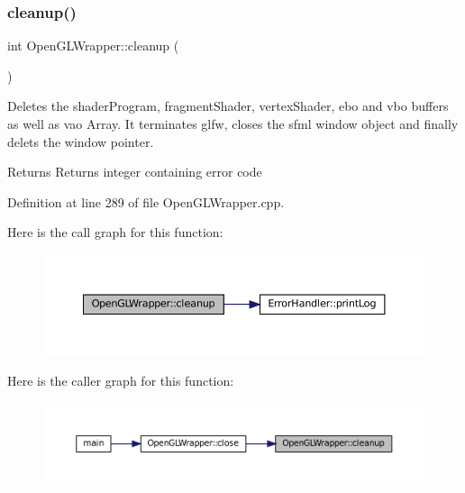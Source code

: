 \subsubsection{\texorpdfstring{cleanup()}{cleanup()}}
{\footnotesize\ttfamily int Open\+G\+L\+Wrapper\+::cleanup (\begin{DoxyParamCaption}{ }\end{DoxyParamCaption})\hspace{0.3cm}{\ttfamily [private]}}



Deletes the shader\+Program, fragment\+Shader, vertex\+Shader, ebo and vbo buffers as well as vao Array. It terminates glfw, closes the sfml window object and finally delets the window pointer. 

\begin{DoxyReturn}{Returns}
Returns integer containing error code 
\end{DoxyReturn}


Definition at line 289 of file Open\+G\+L\+Wrapper.\+cpp.

Here is the call graph for this function\+:\nopagebreak
\begin{figure}[H]
\begin{center}
\leavevmode
\includegraphics[width=350pt]{classOpenGLWrapper_a0c878818b04f78dd90e44dfed481ccab_cgraph}
\end{center}
\end{figure}
Here is the caller graph for this function\+:\nopagebreak
\begin{figure}[H]
\begin{center}
\leavevmode
\includegraphics[width=350pt]{classOpenGLWrapper_a0c878818b04f78dd90e44dfed481ccab_icgraph}
\end{center}
\end{figure}
\mbox{\label{classOpenGLWrapper_af7418fa6074f3c2044b042edf19326c8}} 
